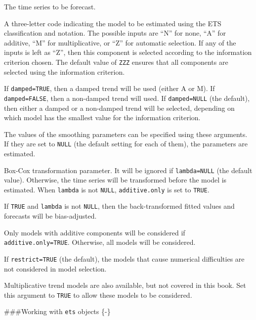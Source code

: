 \documentclass[]{book}
\providecommand{\tightlist}{%
  \setlength{\itemsep}{0pt}\setlength{\parskip}{0pt}}
\begin{document}
\begin{description}
\tightlist
\item[\texttt{y}]
The time series to be forecast.
\item[\texttt{model}]
A three-letter code indicating the model to be estimated using the ETS classification and notation. The possible inputs are ``N'' for none, ``A'' for additive, ``M'' for multiplicative, or ``Z'' for automatic selection. If any of the inputs is left as ``Z'', then this component is selected according to the information criterion chosen. The default value of \texttt{ZZZ} ensures that all components are selected using the information criterion.
\item[\texttt{damped}]
If \texttt{damped=TRUE}, then a damped trend will be used (either A or M). If \texttt{damped=FALSE}, then a non-damped trend will used. If \texttt{damped=NULL} (the default), then either a damped or a non-damped trend will be selected, depending on which model has the smallest value for the information criterion.
\item[\texttt{alpha}, \texttt{beta}, \texttt{gamma}, \texttt{phi}]
The values of the smoothing parameters can be specified using these arguments. If they are set to \texttt{NULL} (the default setting for each of them), the parameters are estimated.
\item[\texttt{lambda}]
Box-Cox transformation parameter. It will be ignored if \texttt{lambda=NULL} (the default value). Otherwise, the time series will be transformed before the model is estimated. When \texttt{lambda} is not \texttt{NULL}, \texttt{additive.only} is set to \texttt{TRUE}.
\item[\texttt{biasadj}]
If \texttt{TRUE} and \texttt{lambda} is not \texttt{NULL}, then the back-transformed fitted values and forecasts will be bias-adjusted.
\item[\texttt{additive.only}]
Only models with additive components will be considered if \texttt{additive.only=TRUE}. Otherwise, all models will be considered.
\item[\texttt{restrict}]
If \texttt{restrict=TRUE} (the default), the models that cause numerical difficulties are not considered in model selection.
\item[\texttt{allow.multiplicative.trend}]
Multiplicative trend models are also available, but not covered in this book. Set this argument to \texttt{TRUE} to allow these models to be considered.
\end{description}

\#\#\#Working with \texttt{ets} objects \{-\}
\end{document}
